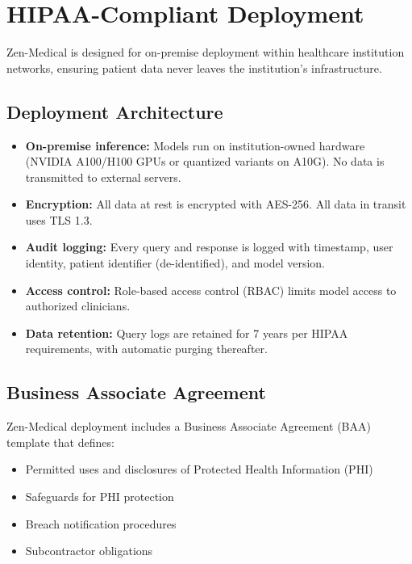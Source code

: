 \documentclass[11pt,a4paper]{article}
\begin{document}
\section{HIPAA-Compliant Deployment}
\label{sec:deployment}

Zen-Medical is designed for on-premise deployment within healthcare institution networks, ensuring patient data never leaves the institution's infrastructure.

\subsection{Deployment Architecture}

\begin{itemize}
    \item \textbf{On-premise inference:} Models run on institution-owned hardware (NVIDIA A100/H100 GPUs or quantized variants on A10G). No data is transmitted to external servers.
    \item \textbf{Encryption:} All data at rest is encrypted with AES-256. All data in transit uses TLS 1.3.
    \item \textbf{Audit logging:} Every query and response is logged with timestamp, user identity, patient identifier (de-identified), and model version.
    \item \textbf{Access control:} Role-based access control (RBAC) limits model access to authorized clinicians.
    \item \textbf{Data retention:} Query logs are retained for 7 years per HIPAA requirements, with automatic purging thereafter.
\end{itemize}

\subsection{Business Associate Agreement}

Zen-Medical deployment includes a Business Associate Agreement (BAA) template that defines:
\begin{itemize}
    \item Permitted uses and disclosures of Protected Health Information (PHI)
    \item Safeguards for PHI protection
    \item Breach notification procedures
    \item Subcontractor obligations
\end{itemize}
\end{document}
